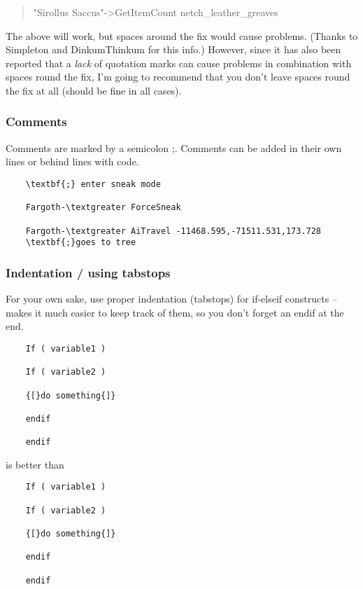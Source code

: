 \begin{quote}
"Sirollus Saccus"-\textgreater GetItemCount netch\_leather\_greaves
\end{quote}

The above will work, but spaces around the fix would cause problems.
(Thanks to Simpleton and DinkumThinkum for this info.) However, since it
has also been reported that a \emph{lack} of quotation marks can cause
problems in combination with spaces round the fix, I'm going to
recommend that you don't leave spaces round the fix at all (should be
fine in all cases).

\hypertarget{comments}{%
\subsubsection{Comments}\label{comments}}

Comments are marked by a semicolon ;. Comments can be added in their own
lines or behind lines with code.

\begin{lstlisting}
	\textbf{;} enter sneak mode
	
	Fargoth-\textgreater ForceSneak
	
	Fargoth-\textgreater AiTravel -11468.595,-71511.531,173.728
	\textbf{;}goes to tree
\end{lstlisting}

\hypertarget{indentation-using-tabstops}{%
\subsubsection{Indentation / using
tabstops}\label{indentation-using-tabstops}}

For your own sake, use proper indentation (tabstops) for if-elseif
constructs -- makes it much easier to keep track of them, so you don't
forget an endif at the end.


\begin{lstlisting}
	If ( variable1 )
	
	If ( variable2 )
	
	{[}do something{]}
	
	endif
	
	endif
\end{lstlisting}
	
is better than

\begin{lstlisting}
	If ( variable1 )
	
	If ( variable2 )
	
	{[}do something{]}
	
	endif
	
	endif
\end{lstlisting}

